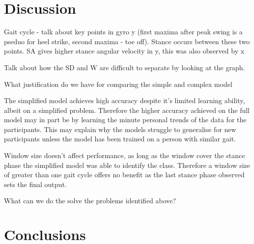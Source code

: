 \documentclass[sensors,article,submit,moreauthors,pdftex]{Definitions/mdpi}
\begin{document}
\section{Discussion}
Gait cycle - talk about key points in gyro y (first maxima after peak swing is a pseduo for heel strike, second maxima - toe off). Stance occurs between these two points. SA gives higher stance angular velocity in y, this was also observed by x \cite{}

Talk about how the SD and W are difficult to separate by looking at the graph.

What justification do we have for comparing the simple and complex model

The simplified model achieves high accuracy despite it's limited learning ability, albeit on a simplified problem. Therefore the higher accuracy achieved on the full model may in part be by learning the minute personal trends of the data for the participants. This may explain why the models struggle to generalise for new participants unless the model has been trained on a person with similar gait.

Window size doesn't affect performance, as long as the window cover the stance phase the simplified model was able to identify the class. Therefore a window size of greater than one gait cycle offers no benefit as the last stance phase observed sets the final output.

What can we do the solve the problems identified above?

\section{Conclusions}

\vspace{6pt} 



\end{document}

